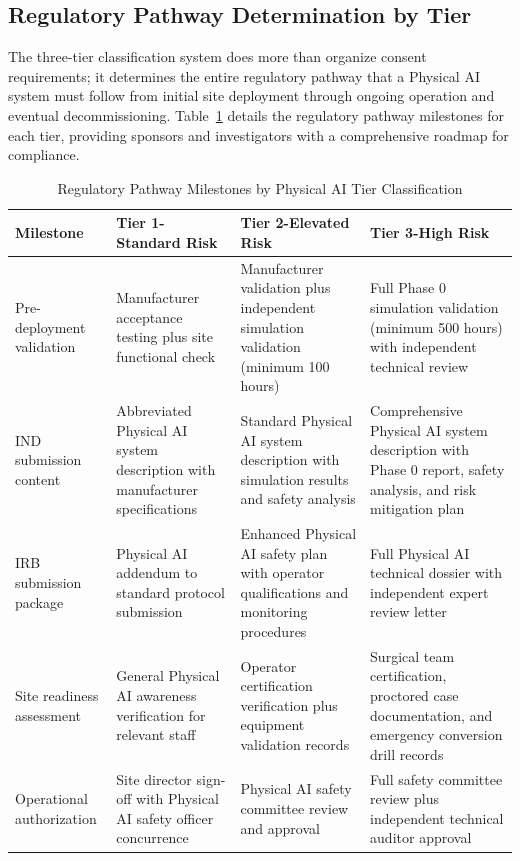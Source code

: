 \subsection{Regulatory Pathway Determination by Tier}
\label{subsec:cfr50-regulatory-pathway}

The three-tier classification system does more than organize consent
requirements; it determines the entire regulatory pathway that a Physical AI
system must follow from initial site deployment through ongoing operation and
eventual decommissioning. Table~\ref{tab:tier-regulatory-pathway} details the
regulatory pathway milestones for each tier, providing sponsors and
investigators with a comprehensive roadmap for compliance.

\clearpage

\begin{table}[H]
\centering
\caption{Regulatory Pathway Milestones by Physical AI Tier Classification}
\label{tab:tier-regulatory-pathway}
\small
\begin{tabularx}{\textwidth}{p{3.25cm} X X X}
\toprule
\textbf{Milestone} & \textbf{Tier 1-Standard Risk} & \textbf{Tier 2-Elevated Risk} & \textbf{Tier 3-High Risk} \\
\midrule
Pre-deployment validation & Manufacturer acceptance testing plus site functional check & Manufacturer validation plus independent simulation validation (minimum 100 hours) & Full Phase 0 simulation validation (minimum 500 hours) with independent technical review \\
\midrule
IND submission content & Abbreviated Physical AI system description with manufacturer specifications & Standard Physical AI system description with simulation results and safety analysis & Comprehensive Physical AI system description with Phase 0 report, safety analysis, and risk mitigation plan \\
\midrule
IRB submission package & Physical AI addendum to standard protocol submission & Enhanced Physical AI safety plan with operator qualifications and monitoring procedures & Full Physical AI technical dossier with independent expert review letter \\
\midrule
Site readiness assessment & General Physical AI awareness verification for relevant staff & Operator certification verification plus equipment validation records & Surgical team certification, proctored case documentation, and emergency conversion drill records \\
\midrule
Operational authorization & Site director sign-off with Physical AI safety officer concurrence & Physical AI safety committee review and approval & Full safety committee review plus independent technical auditor approval \\

\end{tabularx}
\end{table}
